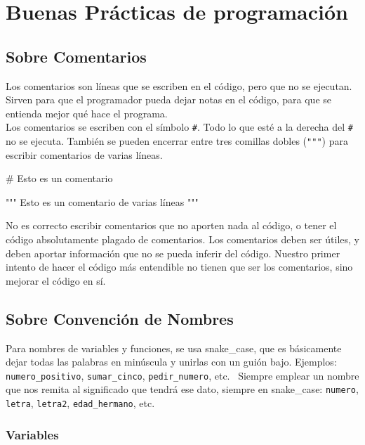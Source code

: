 \documentclass[
  letterpaper,
  DIV=11,
  numbers=noendperiod]{scrreprt}
\newenvironment{Shaded}{\begin{snugshade}}{\end{snugshade}}
\newcommand{\CommentTok}[1]{\textcolor[rgb]{0.37,0.37,0.37}{#1}}
\begin{document}
\section{Buenas Prácticas de
programación}\label{buenas-pruxe1cticas-de-programaciuxf3n}

\subsection{Sobre Comentarios}\label{sobre-comentarios}

Los comentarios son líneas que se escriben en el código, pero que no se
ejecutan. Sirven para que el programador pueda dejar notas en el código,
para que se entienda mejor qué hace el programa.\\
Los comentarios se escriben con el símbolo \texttt{\#}. Todo lo que esté
a la derecha del \texttt{\#} no se ejecuta. También se pueden encerrar
entre tres comillas dobles (\texttt{"""}) para escribir comentarios de
varias líneas.

\begin{Shaded}
\begin{Highlighting}[]
\CommentTok{\# Esto es un comentario}

\CommentTok{""" Esto es un comentario}
\CommentTok{de varias líneas """}
\end{Highlighting}
\end{Shaded}

No es correcto escribir comentarios que no aporten nada al código, o
tener el código absolutamente plagado de comentarios. Los comentarios
deben ser útiles, y deben aportar información que no se pueda inferir
del código. Nuestro primer intento de hacer el código más entendible no
tienen que ser los comentarios, sino mejorar el código en sí.

\subsection{Sobre Convención de
Nombres}\label{sobre-convenciuxf3n-de-nombres}

Para nombres de variables y funciones, se usa snake\_case, que es
básicamente dejar todas las palabras en minúscula y unirlas con un guión
bajo. Ejemplos: \texttt{numero\_positivo}, \texttt{sumar\_cinco},
\texttt{pedir\_numero}, etc.~ Siempre emplear un nombre que nos remita
al significado que tendrá ese dato, siempre en snake\_case:
\texttt{numero}, \texttt{letra}, \texttt{letra2},
\texttt{edad\_hermano}, etc.

\subsubsection{Variables}\label{variables-1}
\end{document}
